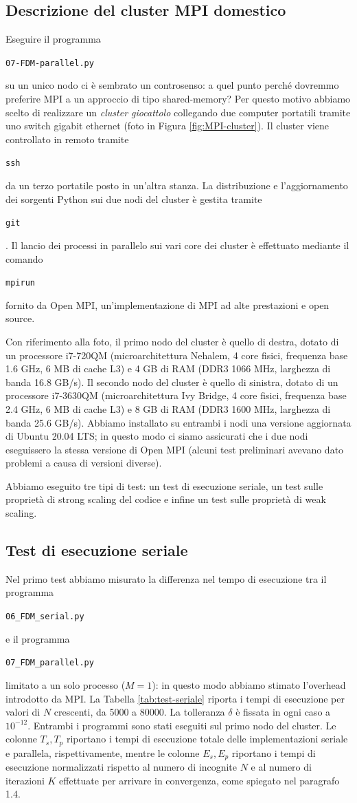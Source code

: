 \documentclass[a4paper,11pt]{article}
\newcommand{\code}[1]{\begin{small}\texttt{#1}\end{small}}
\begin{document}
\subsection{Descrizione del cluster MPI domestico}
Eseguire il programma \code{07-FDM-parallel.py} su un unico
nodo ci è sembrato un controsenso: a quel punto perché
dovremmo preferire MPI a un approccio di tipo shared-memory?
Per questo motivo abbiamo scelto di realizzare
un \emph{cluster giocattolo} collegando due computer
portatili tramite uno switch gigabit ethernet
(foto in Figura \ref{fig:MPI-cluster}). Il cluster viene
controllato in remoto tramite \code{ssh} da un terzo portatile
posto in un'altra stanza. La distribuzione e l'aggiornamento
dei sorgenti Python sui due nodi del cluster è gestita tramite
\code{git}. Il lancio dei processi in parallelo sui vari
core dei cluster è effettuato mediante il comando \code{mpirun}
fornito da Open MPI, un'implementazione di MPI ad alte
prestazioni e open source.

Con riferimento alla foto,
il primo nodo del cluster è quello di destra,
dotato di un processore i7-720QM (microarchitettura
Nehalem, 4 core fisici, frequenza base 1.6 GHz, 6 MB di cache L3)
e 4 GB di RAM (DDR3 1066 MHz, larghezza di banda 16.8 GB/s).
Il secondo nodo del cluster è quello di sinistra,
dotato di un processore i7-3630QM (microarchitettura Ivy Bridge,
4 core fisici, frequenza base 2.4 GHz, 6 MB di cache L3)
e 8 GB di RAM (DDR3 1600 MHz, larghezza di banda 25.6 GB/s).
%
Abbiamo installato su entrambi i nodi una versione aggiornata
di Ubuntu 20.04 LTS; in questo modo ci siamo assicurati
che i due nodi eseguissero la stessa versione di Open MPI
(alcuni test preliminari avevano dato problemi a causa
di versioni diverse).

Abbiamo eseguito tre tipi di test: un test di esecuzione
seriale, un test sulle proprietà di strong scaling del codice
e infine un test sulle proprietà di weak scaling.

\subsection{Test di esecuzione seriale}
Nel primo test abbiamo misurato la differenza nel tempo
di esecuzione tra il programma \code{06\_FDM\_serial.py}
e il programma \code{07\_FDM\_parallel.py}
limitato a un solo processo ($M = 1$): in questo modo
abbiamo stimato l'overhead introdotto da MPI.
%
La Tabella \ref{tab:test-seriale} riporta i tempi di esecuzione
per valori di $N$ crescenti, da 5000 a 80000.
La tolleranza $\delta$ è fissata in ogni caso a $10^{-12}$.
Entrambi i programmi sono stati eseguiti sul primo
nodo del cluster.
Le colonne $T_s, T_p$ riportano i tempi di esecuzione totale
delle implementazioni seriale e parallela, rispettivamente,
mentre le colonne $E_s, E_p$ riportano i tempi di esecuzione
normalizzati rispetto al numero di incognite $N$ e al numero
di iterazioni $K$ effettuate per arrivare in convergenza,
come spiegato nel paragrafo 1.4.
\end{document}
